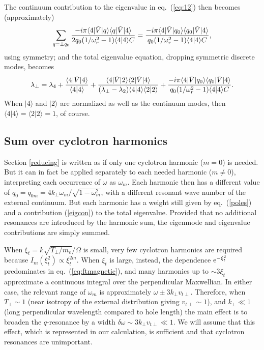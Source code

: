 \documentclass[12pt]{article}
\def\ket#1{|#1\rangle}
\def\bra#1{\langle#1}
\def\etothe#1{{\rm e}^{#1}}
\begin{document}
The continuum contribution to the eigenvalue in eq.\ (\ref{eq:12}) then
becomes (approximately)
\begin{equation}
  \label{eigcon}
  \sum_{q=\pm q_0} {-i\pi\bra{4}|\tilde V \ket{q}\bra{q}|\tilde{V}\ket{4}
    \over
    2q_0(1/\omega_r^2-1)\bra{4}\ket{4}C}
  ={-i\pi\bra{4}|\tilde V \ket{q_0}\bra{q_0}|\tilde{V}\ket{4}
    \over
    q_0(1/\omega_r^2-1)\bra{4}\ket{4}C},
\end{equation}
using symmetry; and the total eigenvalue equation, dropping symmetric discrete modes, becomes
\begin{equation}
  \label{eigtotal}
  \lambda_\perp=\lambda_4+{\bra{4}|\tilde{V}\ket{4}\over
    \bra{4}\ket{4}}
    +{\bra{4}|\tilde{V}\ket{2}\bra{2}|\tilde{V}\ket{4}\over
      (\lambda_\perp-\lambda_2)\bra{4}\ket{4} \bra{2}\ket{2}}
    +%
    {-i\pi\bra{4}|\tilde V \ket{q_0}\bra{q_0}|\tilde{V}\ket{4}
    \over
    q_0(1/\omega_r^2-1)\bra{4}\ket{4}C}.
\end{equation}
When $\ket{4}$ and $\ket{2}$ are normalized as well as the
continuum modes, then $\bra{4}\ket{4}=\bra{2}\ket{2}=1$, of
course.

\subsection{Sum over cyclotron harmonics}

Section \ref{reducing} is written as if only one cyclotron harmonic
($m=0$) is needed. But it can in fact be applied separately to each
needed harmonic ($m\not=0$), interpreting each occurrence of $\omega$
as $\omega_m$. Each harmonic then has a different value of
$q_0=q_{0m}=4k_\perp\omega_m/\sqrt{1-\omega_m^2}$, with a different
resonant wave number of the external continuum. But each harmonic has
a weight still given by eq.\ (\ref{poles}) and a contribution
(\ref{eigcon}) to the total eigenvalue. Provided that no additional
resonances are introduced by the harmonic sum, the eigenmode and
eigenvalue contributions are simply summed.

When $\xi_t=k\sqrt{T_\perp/m_e}/\Omega$ is small, very few cyclotron
harmonics are required because $I_m(\xi_t^2)\propto \xi_t^{2m}$. When
$\xi_t$ is large, instead, the dependence $\etothe{-\xi_t^2}$
predominates in eq.\ (\ref{eq:ftmagnetic}), and many harmonics up to
$\sim 3\xi_t$ approximate a continuous integral over the perpendicular
Maxwellian. In either case, the relevant range of $\omega_m$ is
approximately $\omega\pm 3k_\perp v_{t\perp}$. Therefore, when
$T_\perp \sim 1$ (near isotropy of the external distribution giving
$ v_{t\perp}\sim 1$), and $k_\perp\ll 1$ (long perpendicular wavelength
compared to hole length) the main effect is to broaden the
$q$-resonance by a width
$\delta \omega\sim3k_\perp v_{t\perp}\ll 1 $. We will assume
that this effect, which is represented in our calculation, is
sufficient and that cyclotron resonances are unimportant.
\end{document}
